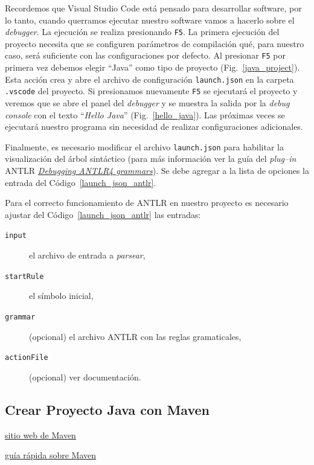 Recordemos que Visual Studio Code está pensado para desarrollar software, por lo tanto, cuando querramos ejecutar nuestro software vamos a hacerlo sobre el \emph{debugger}.  La ejecución se realiza presionando \verb|F5|.  La primera ejecución del proyecto necesita que se configuren parámetros de compilación qué, para nuestro caso, será suficiente con las configuraciones por defecto.  Al presionar \verb|F5| por primera vez debemos elegir ``Java'' como tipo de proyecto  (Fig.~\ref{java_project}).  Esta acción crea y abre el archivo de configuración \verb|launch.json| en la carpeta \verb|.vscode| del proyecto.  Si presionamos nuevamente \verb|F5| se ejecutará el proyecto y veremos que se abre el panel del \emph{debugger} y se muestra la salida por la \emph{debug console} con el texto ``\emph{Hello Java}'' (Fig.~\ref{hello_java}).  Las próximas veces se ejecutará nuestro programa sin necesidad de realizar configuraciones adicionales.

Finalmente, es necesario modificar el archivo \verb|launch.json| para habilitar la visualización del árbol sintáctico (para más información ver la guía del \emph{plug--in} ANTLR \href{https://github.com/mike-lischke/vscode-antlr4/blob/master/doc/grammar-debugging.md}{\emph{Debugging ANTLR4 grammars}}).  Se debe agregar a la lista de opciones la entrada del Código~\ref{launch_json_antlr}.



Para el correcto funcionamiento de ANTLR en nuestro proyecto es necesario ajustar del Código~\ref{launch_json_antlr} las entradas:
\begin{description}
	\item[\texttt{input}] el archivo de entrada a \emph{parsear},
	\item[\texttt{startRule}] el símbolo inicial,
	\item[\texttt{grammar}] (opcional) el archivo ANTLR con las reglas gramaticales,
	\item[\texttt{actionFile}] (opcional) ver documentación.
\end{description}

\subsection{Crear Proyecto Java con Maven}
\label{proyecto_maven}



\href{https://maven.apache.org/}{sitio web de Maven}

\href{https://maven.apache.org/guides/getting-started/maven-in-five-minutes.html}{guía rápida sobre Maven}


